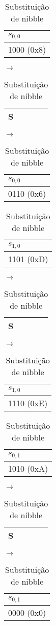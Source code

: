 \documentclass[
    article,            %
    11pt,               %
    oneside,            %
    a4paper,            %
    english,            %
    brazil,             %
    sumario=tradicional,
    ]{abntex2}
\begin{document}
\begin{table}[H]
\centering
\caption{Substituição de nibble}
\label{round1-nibbles-change}
\begin{tabular}{|l|}
\hline
$s_{0,0}$  \\ \hline
1000 (0x8)      \\ \hline
\end{tabular}
$\longrightarrow$
\begin{tabular}{|l|}
\hline
S  \\ \hline
\end{tabular}
$\longrightarrow$
\begin{tabular}{|l|}
\hline
$s_{0,0}$  \\ \hline
0110 (0x6)       \\ \hline
\end{tabular}

\vspace{0.5cm}

\begin{tabular}{|l|}
\hline
$s_{1,0}$  \\ \hline
1101 (0xD)      \\ \hline
\end{tabular}
$\longrightarrow$
\begin{tabular}{|l|}
\hline
S  \\ \hline
\end{tabular}
$\longrightarrow$
\begin{tabular}{|l|}
\hline
$s_{1,0}$  \\ \hline
1110 (0xE)       \\ \hline
\end{tabular}

\vspace{0.5cm}

\begin{tabular}{|l|}
\hline
$s_{0,1}$  \\ \hline
1010 (0xA)      \\ \hline
\end{tabular}
$\longrightarrow$
\begin{tabular}{|l|}
\hline
S  \\ \hline
\end{tabular}
$\longrightarrow$
\begin{tabular}{|l|}
\hline
$s_{0,1}$  \\ \hline
0000 (0x0)       \\ \hline
\end{tabular}

\vspace{0.5cm}


\end{table}
\end{document}
